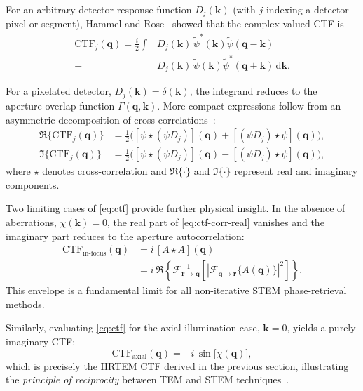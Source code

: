 \documentclass[pdflatex,sn-aps,iicol]{sn-jnl}%
\begin{document}
For an arbitrary detector response function $D_j(\boldsymbol{k})$ (with $j$ indexing a detector pixel or segment), Hammel and Rose~\cite{Hammel_1995} showed that the complex-valued CTF is~\cite{Hammel_1995,rose_1977}
\begin{align}
  \mathrm{CTF}_j(\boldsymbol{q}) = \frac{i}{2} \int
    &D_j(\boldsymbol{k})\,\tilde{\psi}^{*}(\boldsymbol{k})\tilde{\psi}(\boldsymbol{q}-\boldsymbol{k}) \nonumber \\
    - &D_j(\boldsymbol{k})\,\tilde{\psi}(\boldsymbol{k})\tilde{\psi}^{*}(\boldsymbol{q}+\boldsymbol{k})
  \,\mathrm{d}\boldsymbol{k}.
  \label{eq:ctf}
\end{align}

For a pixelated detector, $D_j(\boldsymbol{k})=\delta(\boldsymbol{k})$, the integrand reduces to the aperture-overlap function $\Gamma(\boldsymbol{q},\boldsymbol{k})$.
More compact expressions follow from an asymmetric decomposition of cross-correlations~\cite{Bekkevold_2025,Lazic_2017}:
\begin{align}
  \Re\{\mathrm{CTF}_j(\boldsymbol{q})\} &= \frac{1}{2}
   \Big(
    [\psi \star (\psi D_j)](\boldsymbol{q})
    +
    [(\psi D_j)\star \psi](\boldsymbol{q})
  \Big),
  \label{eq:ctf-corr-real} \\
  \Im\{\mathrm{CTF}_j(\boldsymbol{q})\} &= \frac{1}{2}
  \Big(
    [\psi \star (\psi D_j)](\boldsymbol{q})
    - [(\psi D_j)\star \psi](\boldsymbol{q})
  \Big),
  \label{eq:ctf-corr-imag}
\end{align}
where $\star$ denotes cross-correlation and $\Re\{\cdot\}$ and $\Im\{\cdot\}$ represent real and imaginary components.

Two limiting cases of \cref{eq:ctf} provide further physical insight.
In the absence of aberrations, $\chi(\boldsymbol{k})=0$, the real part of \cref{eq:ctf-corr-real} vanishes and the imaginary part reduces to the aperture autocorrelation:
\begin{align}
  \mathrm{CTF}_{\text{in-focus}}(\boldsymbol{q}) &= i\,[A\star A](\boldsymbol{q}) \nonumber \\
  &= i\,\Re\!\left\{ \mathcal{F}^{-1}_{\boldsymbol{r}\rightarrow\boldsymbol{q}} \left[ \left| \mathcal{F}_{\boldsymbol{q}\rightarrow\boldsymbol{r}}\{A(\boldsymbol{q})\} \right|^2 \right] \right\}.
  \label{eq:infocus-ctf}
\end{align}
This envelope is a fundamental limit for all non-iterative STEM phase-retrieval methods.

Similarly, evaluating \cref{eq:ctf} for the axial-illumination case, $\boldsymbol{k}=0$, yields a purely imaginary CTF:
\begin{equation}
  \mathrm{CTF}_{\text{axial}}(\boldsymbol{q}) = - i\,\sin\!\big[\chi(\boldsymbol{q})\big],
  \label{eq:ctf-axial}
\end{equation}
which is precisely the HRTEM CTF derived in the previous section, illustrating the \emph{principle of reciprocity} between TEM and STEM techniques~\cite{Williams_2009,Carter_2016,Kirkland_2020}.
\end{document}
